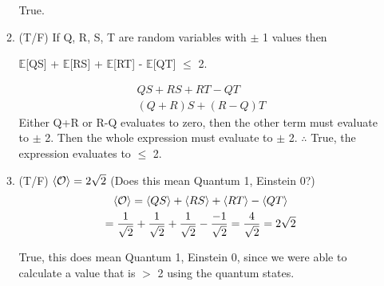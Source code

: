\documentclass[]{article}
\begin{document}
\begin{enumerate}
\begin{enumerate}
          True.
        \item (T/F) If Q, R, S, T are random variables with $\pm$ 1 values then 

          \noindent$\mathbb{E}$[QS] + $\mathbb{E}$[RS] + $\mathbb{E}$[RT] - $\mathbb{E}$[QT] $\le$ 2.

          \begin{gather*}
            QS + RS + RT - QT\\
            (Q+R)S + (R-Q)T
          \end{gather*}
            Either Q+R or R-Q evaluates to zero, then the other term must evaluate to $\pm$ 2.
            Then the whole expression must evaluate to $\pm$ 2. $\therefore$ True, the expression evaluates to $\le$ 2.

        \item (T/F) $\braket{\mathcal O} = 2\sqrt{2}$ (Does this mean Quantum 1, Einstein 0?)
          \begin{gather*}
            \braket{\mathcal O} = \braket{QS} + \braket{RS} + \braket{RT} - \braket{QT}\\
            = \frac{1}{\sqrt{2}} + \frac{1}{\sqrt{2}} + \frac{1}{\sqrt{2}} - \frac{-1}{\sqrt{2}} = \frac{4}{\sqrt{2}}
            = 2\sqrt{2}
          \end{gather*}

          True, this does mean Quantum 1, Einstein 0, since we were able to calculate a value that is $>$ 2 
          using the quantum states.
      \end{enumerate}
    \end{enumerate}
\end{document}
